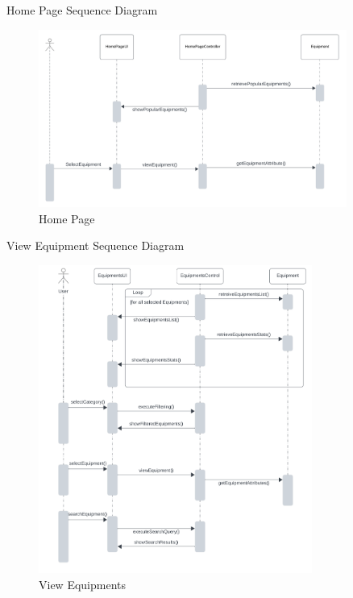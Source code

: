 \documentclass[20pt]{beamer}
\numberwithin{figure}{section}
\begin{document}
\begin{frame}{Home Page Sequence Diagram}

     \begin{figure}
        \centering
        \includegraphics[width= 0.9\textwidth , height= 0.6\paperheight]{HomePageSeq.png}
        \caption{Home Page}
        \label{fig:28}
    \end{figure}

\end{frame}

\begin{frame}{View Equipment Sequence Diagram}

     \begin{figure}
        \centering
        \includegraphics[width= 0.8\textwidth , height= 0.8\paperheight]{EquipmentsViewSeq.png}
        \caption{View Equipments}
        \label{fig:29}
    \end{figure}

\end{frame}
\end{document}
